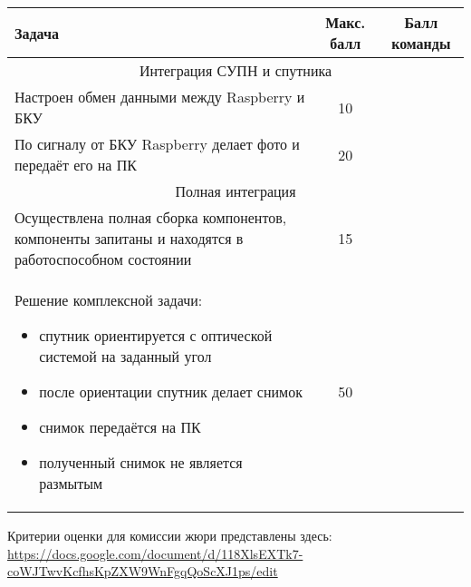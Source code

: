 \begin{table}[H]
    \begin{center}
        \begin{tabular}{|p{8cm}|c|c|}
            \hline
            Задача & Макс. балл & Балл команды \\
            \hline
            \multicolumn{3}{|c|}{Интеграция СУПН и спутника} \\
            \hline
            Настроен обмен данными между Raspberry и БКУ&	10& \\
            \hline
            По сигналу от БКУ Raspberry делает фото и передаёт его на ПК&	20	& \\
            \multicolumn{3}{|c|}{Полная интеграция} \\
            \hline
            Осуществлена полная сборка компонентов, компоненты запитаны и находятся в работоспособном состоянии	&15& \\
            \hline
            Решение комплексной задачи:
            \begin{itemize}
                \item спутник ориентируется с оптической системой на заданный угол
                \item после ориентации спутник делает снимок
                \item снимок передаётся на ПК
                \item полученный снимок не является размытым
            \end{itemize}	& 50 & \\
            \hline	
        \end{tabular}
    \end{center}
\end{table}

Критерии оценки для комиссии жюри представлены здесь: \url{https://docs.google.com/document/d/118XlsEXTk7-coWJTwvKcfhsKpZXW9WnFgqQoScXJ1ps/edit}
